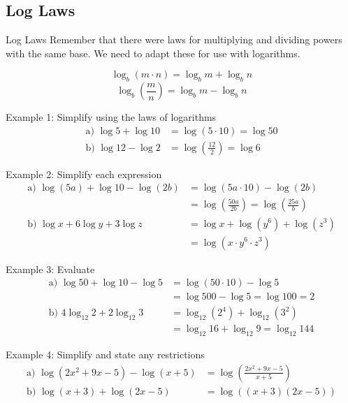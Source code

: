 \documentclass{article}
\begin{document}
\subsection{Log Laws}

\begin{lessonbox}{Log Laws}
Remember that there were laws for multiplying and dividing powers with the same base. We need to adapt these for use with logarithms.

\[
\log_b(m \cdot n) = \log_b{m} + \log_b{n}
\]
\[
\log_b\left(\frac{m}{n}\right) = \log_b{m} - \log_b{n}
\]
\end{lessonbox}

\begin{examplebox}{Example 1: Simplify using the laws of logarithms}
\begin{align*}
    \text{a) } \log{5} + \log{10} &= \log{(5 \cdot 10)} = \log{50}\\
    \text{b) } \log{12} - \log{2} &= \log{\left(\frac{12}{2}\right)} = \log{6}
\end{align*}
\end{examplebox}

\begin{examplebox}{Example 2: Simplify each expression}
\begin{align*}
    \text{a) } \log{(5a)} + \log{10} - \log{(2b)} &= \log{(5a \cdot 10)} - \log{(2b)} \\
    &= \log{\left(\frac{50a}{2b}\right)} = \log{\left(\frac{25a}{b}\right)}\\
    \text{b) } \log{x} + 6 \log{y} + 3 \log{z} &= \log{x} + \log{(y^6)} + \log{(z^3)} \\
    &= \log{(x \cdot y^6 \cdot z^3)}
\end{align*}
\end{examplebox}

\begin{examplebox}{Example 3: Evaluate}
\begin{align*}
    \text{a) } \log{50} + \log{10} - \log{5} &= \log{(50 \cdot 10)} - \log{5}\\
    &= \log{500} - \log{5} = \log{100} = 2\\
    \text{b) } 4 \log_{12}{2} + 2 \log_{12}{3}
    &= \log_{12}{(2^4)} + \log_{12}{(3^2)} \\
    &= \log_{12}{16} + \log_{12}{9} = \log_{12}{144}
\end{align*}
\end{examplebox}

\begin{examplebox}{Example 4: Simplify and state any restrictions}
\begin{align*}
    \text{a) } \log{(2x^2 + 9x - 5)} - \log{(x + 5)} &= \log{\left(\frac{2x^2 + 9x - 5}{x + 5}\right)}\\
    \text{b) } \log{(x+3)} + \log{(2x-5)} &= \log{((x+3)(2x-5))}
\end{align*}
\end{examplebox}
\end{document}
